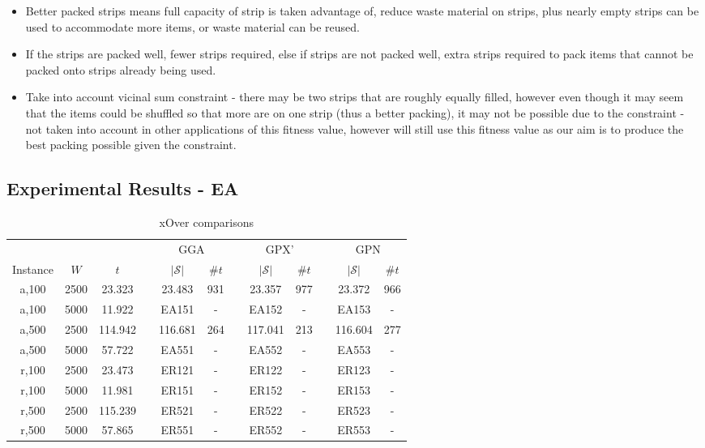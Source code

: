 \documentclass{elsarticle}
\begin{document}
\begin{itemize}
	\item Better packed strips means full capacity of strip is taken advantage of, reduce waste material on strips, plus nearly empty strips can be used to accommodate more items, or waste material can be reused.
	\item If the strips are packed well, fewer strips required, else if strips are not packed well, extra strips required to pack items that cannot be packed onto strips already being used.
	\item Take into account vicinal sum constraint - there may be two strips that are roughly equally filled, however even though it may seem that the items could be shuffled so that more are on one strip (thus a better packing), it may not be possible due to the constraint - not taken into account in other applications of this fitness value, however will still use this fitness value as our aim is to produce the best packing possible given the constraint.
\end{itemize}

\subsection{Experimental Results - EA}
\label{sub:expea}

\begin{table}[h!]
	\centering
	\caption{xOver comparisons}
	\begin{tabular}{cccccccccccc}\toprule
		& & & &\multicolumn{2}{c}{GGA} &\phantom{a}& \multicolumn{2}{c}{GPX'} &\phantom{a}& \multicolumn{2}{c}{GPN}\\
		\cmidrule{5-6} \cmidrule{8-9} \cmidrule{11-12}
		Instance & $W$ & $t$ && $|\mathcal{S}|$ & $\# t$ && $|\mathcal{S}|$ & $\# t$ && $|\mathcal{S}|$ & $\# t$ \\ \midrule	
		a,100 & 2500 & 23.323 && 23.483 & 931 && 23.357 & 977 && 23.372 & 966 \\
		a,100 & 5000 & 11.922 && EA151 & - && EA152 & - && EA153 & -\\
		\midrule
		a,500 & 2500 & 114.942 && 116.681 & 264 && 117.041 & 213 && 116.604 & 277 \\
		a,500 & 5000 & 57.722 && EA551 & - && EA552 & - && EA553 & -\\
		\midrule
		\midrule
		r,100 & 2500 & 23.473 && ER121 & - && ER122 & - && ER123 & -\\
		r,100 & 5000 & 11.981 && ER151 & - && ER152 & - && ER153 & -\\
		\midrule
		r,500 & 2500 & 115.239 && ER521 & - && ER522 & - && ER523 & -\\
		r,500 & 5000 & 57.865 && ER551 & - && ER552 & - && ER553 & -\\
		\bottomrule
	\end{tabular}	
	\label{table:EA}
\end{table}
\end{document}
